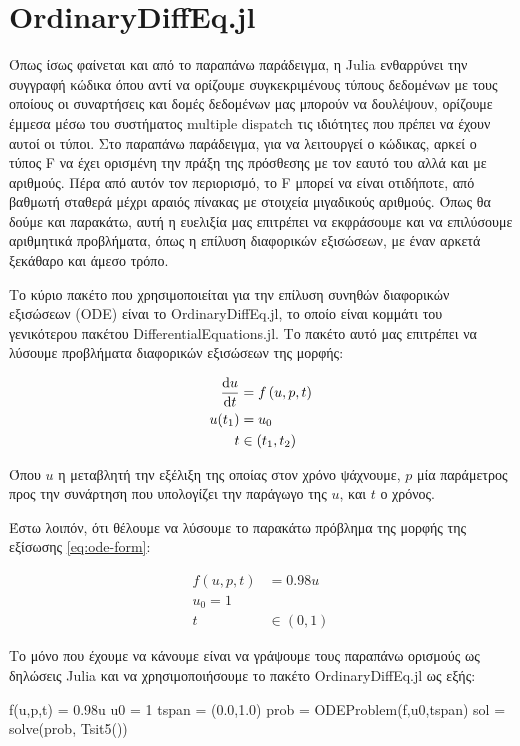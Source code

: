 \section{OrdinaryDiffEq.jl}

Όπως ίσως φαίνεται και από το παραπάνω παράδειγμα, η Julia ενθαρρύνει την συγγραφή κώδικα όπου αντί να ορίζουμε συγκεκριμένους τύπους δεδομένων με τους οποίους οι συναρτήσεις και δομές δεδομένων μας μπορούν να δουλέψουν, ορίζουμε έμμεσα μέσω του συστήματος multiple dispatch τις ιδιότητες που πρέπει να έχουν αυτοί οι τύποι.
Στο παραπάνω παράδειγμα, για να λειτουργεί ο κώδικας, αρκεί ο τύπος F να έχει ορισμένη την πράξη της πρόσθεσης με τον εαυτό του αλλά και με αριθμούς.
Πέρα από αυτόν τον περιορισμό, το F μπορεί να είναι οτιδήποτε, από βαθμωτή σταθερά μέχρι αραιός πίνακας με στοιχεία μιγαδικούς αριθμούς.
Όπως θα δούμε και παρακάτω, αυτή η ευελιξία μας επιτρέπει να εκφράσουμε και να επιλύσουμε αριθμητικά προβλήματα, όπως η επίλυση διαφορικών εξισώσεων, με έναν αρκετά ξεκάθαρο και άμεσο τρόπο.

Το κύριο πακέτο που χρησιμοποιείται για την επίλυση συνηθών διαφορικών εξισώσεων (ODE) είναι το OrdinaryDiffEq.jl, το οποίο είναι κομμάτι του γενικότερου πακέτου DifferentialEquations.jl.
Το πακέτο αυτό μας επιτρέπει να λύσουμε προβλήματα διαφορικών εξισώσεων της μορφής:

\begin{align}
    \label{eq:ode-form}
    \frac{\mathrm{d}u}{\mathrm{d}t} &= f \left( u, p, t \right) \\
    u(t_1) &= u_0 \notag \\
    t &\in \left(t_1, t_2\right) \notag
\end{align}

Όπου $u$ η μεταβλητή την εξέλιξη της οποίας στον χρόνο ψάχνουμε, $p$ μία παράμετρος προς την συνάρτηση που υπολογίζει την παράγωγο της $u$, και $t$ ο χρόνος.

Έστω λοιπόν, ότι θέλουμε να λύσουμε το παρακάτω πρόβλημα της μορφής της εξίσωσης \eqref{eq:ode-form}:

\begin{align*}
    f(u, p, t) &= 0.98u \\
    u_0 = 1 \\
    t &\in (0, 1)
\end{align*}

Το μόνο που έχουμε να κάνουμε είναι να γράψουμε τους παραπάνω ορισμούς ως δηλώσεις Julia και να χρησιμοποιήσουμε το πακέτο OrdinaryDiffEq.jl ως εξής:

\begin{jllisting}[language=julia]
f(u,p,t) = 0.98u
u0 = 1
tspan = (0.0,1.0)
prob = ODEProblem(f,u0,tspan)
sol = solve(prob, Tsit5())
\end{jllisting}


